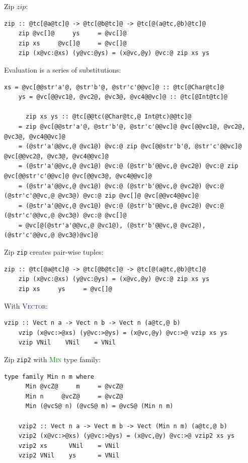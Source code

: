 \documentclass[xcolor={usenames,dvipsnames}]{beamer}
\newcommand{\htycon}[1]{\textcolor{MidnightBlue}{\textsc{#1}}}
\newcommand{\htyfam}[1]{\textcolor{Green}{\textsc{#1}}}
\begin{document}
\begin{frame}[fragile]{Zip}
  $zip$:
  \begin{lstlisting}[style=hask]
    zip :: @tc[@a@tc]@ -> @tc[@b@tc]@ -> @tc[@(a@tc,@b)@tc]@
    zip @vc[]@     ys     = @vc[]@
    zip xs     @vc[]@     = @vc[]@
    zip (x@vc:@xs) (y@vc:@ys) = (x@vc,@y) @vc:@ zip xs ys
  \end{lstlisting}

  Evaluation is a series of substitutions:
  \begin{lstlisting}[style=hask]
    xs = @vc[@@str'a'@, @str'b'@, @str'c'@@vc]@ :: @tc[@Char@tc]@
    ys = @vc[@@vc1@, @vc2@, @vc3@, @vc4@@vc]@ :: @tc[@Int@tc]@

      zip xs ys :: @tc[@@tc(@Char@tc,@ Int@tc)@@tc]@
    = zip @vc[@@str'a'@, @str'b'@, @str'c'@@vc]@ @vc[@@vc1@, @vc2@, @vc3@, @vc4@@vc]@
    = (@str'a'@@vc,@ @vc1@) @vc:@ zip @vc[@@str'b'@, @str'c'@@vc]@ @vc[@@vc2@, @vc3@, @vc4@@vc]@
    = (@str'a'@@vc,@ @vc1@) @vc:@ (@str'b'@@vc,@ @vc2@) @vc:@ zip @vc[@@str'c'@@vc]@ @vc[@@vc3@, @vc4@@vc]@
    = (@str'a'@@vc,@ @vc1@) @vc:@ (@str'b'@@vc,@ @vc2@) @vc:@ (@str'c'@@vc,@ @vc3@) @vc:@ zip @vc[]@ @vc[@@vc4@@vc]@
    = (@str'a'@@vc,@ @vc1@) @vc:@ (@str'b'@@vc,@ @vc2@) @vc:@ (@str'c'@@vc,@ @vc3@) @vc:@ @vc[]@
    = @vc[@(@str'a'@@vc,@ @vc1@), (@str'b'@@vc,@ @vc2@), (@str'c'@@vc,@ @vc3@)@vc]@
  \end{lstlisting}
\end{frame}

\begin{frame}[fragile]{Zip}
  \texttt{zip} creates pair-wise tuples:
  \begin{lstlisting}[style=hask]
    zip :: @tc[@a@tc]@ -> @tc[@b@tc]@ -> @tc[@(a@tc,@b)@tc]@
    zip (x@vc:@xs) (y@vc:@ys) = (x@vc,@y) @vc:@ zip xs ys
    zip xs     ys     = @vc[]@
  \end{lstlisting}

  With \htycon{Vector}:
  \begin{lstlisting}[style=hask]
    vzip :: Vect n a -> Vect n b -> Vect n (a@tc,@ b)
    vzip (x@vc:>@xs) (y@vc:>@ys) = (x@vc,@y) @vc:>@ vzip xs ys
    vzip VNil    VNil    = VNil
  \end{lstlisting}
\end{frame}

\begin{frame}[fragile]{Zip}
  \texttt{zip2} with \htyfam{Min} type family:
  \begin{lstlisting}[style=hask]
    type family Min n m where
      Min @vcZ@     m     = @vcZ@
      Min n     @vcZ@     = @vcZ@
      Min (@vcS@ n) (@vcS@ m) = @vcS@ (Min n m)

    vzip2 :: Vect n a -> Vect m b -> Vect (Min n m) (a@tc,@ b)
    vzip2 (x@vc:>@xs) (y@vc:>@ys) = (x@vc,@y) @vc:>@ vzip2 xs ys
    vzip2 xs      VNil    = VNil
    vzip2 VNil    ys      = VNil
  \end{lstlisting}
\end{frame}
\end{document}
